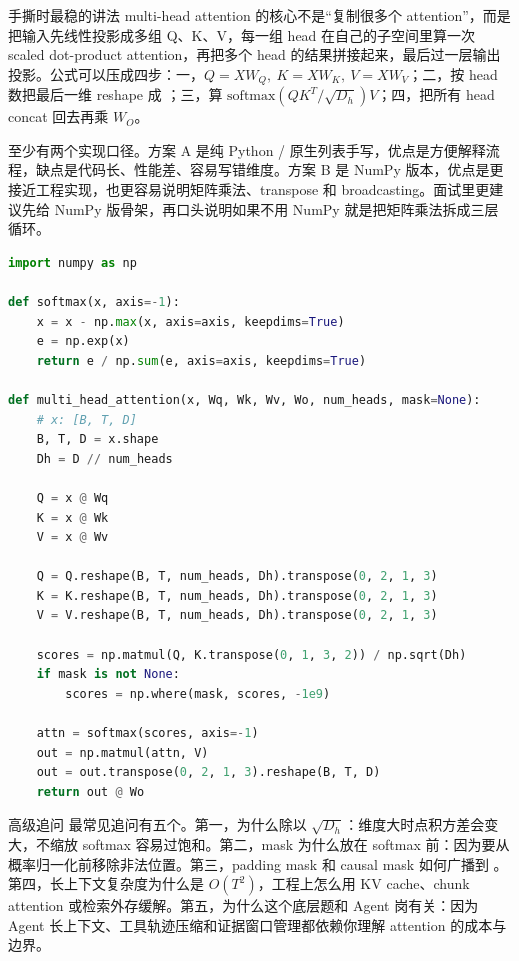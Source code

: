 \documentclass[12pt]{article}
\begin{document}
\begin{analysisBox}{手撕时最稳的讲法}
multi-head attention 的核心不是“复制很多个 attention”，而是把输入先线性投影成多组 Q、K、V，每一组 head 在自己的子空间里算一次 scaled dot-product attention，再把多个 head 的结果拼接起来，最后过一层输出投影。公式可以压成四步：一，$Q=XW_Q,\ K=XW_K,\ V=XW_V$；二，按 head 数把最后一维 reshape 成 \term{[B, H, T, D\_h]}；三，算 $\mathrm{softmax}(QK^T / \sqrt{D_h})V$；四，把所有 head concat 回去再乘 $W_O$。

至少有两个实现口径。方案 A 是纯 Python / 原生列表手写，优点是方便解释流程，缺点是代码长、性能差、容易写错维度。方案 B 是 NumPy 版本，优点是更接近工程实现，也更容易说明矩阵乘法、transpose 和 broadcasting。面试里更建议先给 NumPy 版骨架，再口头说明如果不用 NumPy 就是把矩阵乘法拆成三层循环。
\end{analysisBox}

\begin{lstlisting}[language=Python,caption={NumPy 版 multi-head attention 最小骨架}]
import numpy as np

def softmax(x, axis=-1):
    x = x - np.max(x, axis=axis, keepdims=True)
    e = np.exp(x)
    return e / np.sum(e, axis=axis, keepdims=True)

def multi_head_attention(x, Wq, Wk, Wv, Wo, num_heads, mask=None):
    # x: [B, T, D]
    B, T, D = x.shape
    Dh = D // num_heads

    Q = x @ Wq
    K = x @ Wk
    V = x @ Wv

    Q = Q.reshape(B, T, num_heads, Dh).transpose(0, 2, 1, 3)
    K = K.reshape(B, T, num_heads, Dh).transpose(0, 2, 1, 3)
    V = V.reshape(B, T, num_heads, Dh).transpose(0, 2, 1, 3)

    scores = np.matmul(Q, K.transpose(0, 1, 3, 2)) / np.sqrt(Dh)
    if mask is not None:
        scores = np.where(mask, scores, -1e9)

    attn = softmax(scores, axis=-1)
    out = np.matmul(attn, V)
    out = out.transpose(0, 2, 1, 3).reshape(B, T, D)
    return out @ Wo
\end{lstlisting}

\begin{qaBox}{高级追问}
最常见追问有五个。第一，为什么除以 $\sqrt{D_h}$：维度大时点积方差会变大，不缩放 softmax 容易过饱和。第二，mask 为什么放在 softmax 前：因为要从概率归一化前移除非法位置。第三，padding mask 和 causal mask 如何广播到 \term{[B,H,T,T]}。第四，长上下文复杂度为什么是 $O(T^2)$，工程上怎么用 KV cache、chunk attention 或检索外存缓解。第五，为什么这个底层题和 Agent 岗有关：因为 Agent 长上下文、工具轨迹压缩和证据窗口管理都依赖你理解 attention 的成本与边界。
\end{qaBox}
\end{document}
